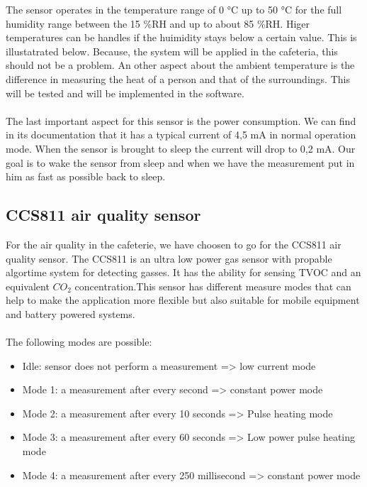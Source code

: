 \documentclass[11pt,a4paper]{article}
\begin{document}
\newpage
The sensor operates in the temperature range of 0 °C up to 50 °C for the full humidity range between the 15 \%RH and up to about 85 \%RH. Higer temperatures can be handles if the huimidity stays below a certain value. This is illustatrated below. Because, the system will be applied in the cafeteria, this should not be a problem. An other aspect about the ambient temperature is the difference in measuring the heat of a person and that of the surroundings. This will be tested and will be implemented in the software. 
\\ \\
The last important aspect for this sensor is the power consumption. We can find in its documentation that it has a typical current of 4,5 mA in normal operation mode. When the sensor is brought to sleep the current will drop to 0,2 mA. Our goal is to wake the sensor from sleep and when we have the measurement put in him as fast as possible back to sleep.

\subsection{CCS811 air quality sensor}
For the air quality in the cafeterie, we have choosen to go for the CCS811 air quality sensor. The CCS811 is an ultra low power gas sensor with propable algortime system for detecting gasses. It has  the ability for sensing TVOC and an equivalent $CO_{2}$ concentration.This sensor has different measure modes that can help to make the application more flexible but also suitable for mobile equipment and battery powered systems.
\\ \\
The following modes are possible:
\begin{itemize}
	\item Idle: sensor does not perform a measurement => low current mode
	\item Mode 1: a measurement after every second  => constant power mode
	\item Mode 2:  a measurement after every 10 seconds => Pulse heating mode
	\item Mode 3:  a measurement after every 60 seconds => Low power pulse heating mode
	\item Mode 4: a measurement after every 250 millisecond  => constant power mode
\end{itemize}
\end{document}
